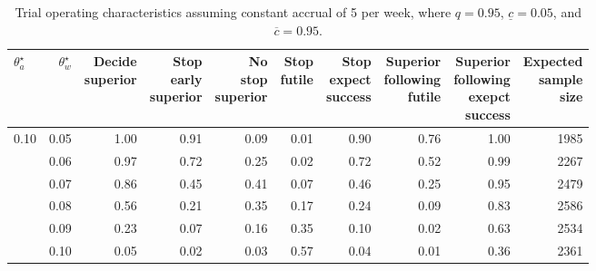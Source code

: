 \documentclass{article}
\begin{document}
\begin{table}[!ht]
	\footnotesize
	\caption{\label{tab:oc1}Trial operating characteristics assuming constant accrual of 5 per week, where $q=0.95$, $\underline{c}=0.05$, and $\overline{c}=0.95$.}
	\centering
	\begin{tabular}[t]{lrrrrrrrrr}
	\toprule
	$\theta_a^\star$ & $\theta_w^\star$ & \makecell{Decide\\superior} & \makecell{Stop\\early\\superior} & \makecell{No\\stop\\superior} & \makecell{Stop\\futile} & \makecell{Stop\\expect\\success} & \makecell{Superior\\following\\futile} & \makecell{Superior\\following\\exepct\\success} & \makecell{Expected\\sample\\size}\\
	\midrule
	0.10 & 0.05 & 1.00 & 0.91 & 0.09 & 0.01 & 0.90 & 0.76 & 1.00 & 1985 \\
	     & 0.06 & 0.97 & 0.72 & 0.25 & 0.02 & 0.72 & 0.52 & 0.99 & 2267 \\
	     & 0.07 & 0.86 & 0.45 & 0.41 & 0.07 & 0.46 & 0.25 & 0.95 & 2479 \\
	     & 0.08 & 0.56 & 0.21 & 0.35 & 0.17 & 0.24 & 0.09 & 0.83 & 2586 \\
	     & 0.09 & 0.23 & 0.07 & 0.16 & 0.35 & 0.10 & 0.02 & 0.63 & 2534 \\
	     & 0.10 & 0.05 & 0.02 & 0.03 & 0.57 & 0.04 & 0.01 & 0.36 & 2361 \\
	\bottomrule
	\end{tabular}
\end{table}
\end{document}
